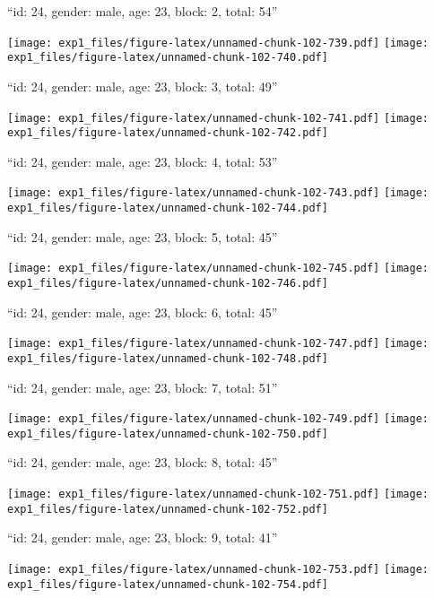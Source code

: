 \documentclass[11pt,,]{article}
\begin{document}
\newpage
[1] 

``id: 24, gender: male, age: 23, block: 2, total: 54''

\texttt{[image: exp1\_files/figure-latex/unnamed-chunk-102-739.pdf]}
\texttt{[image: exp1\_files/figure-latex/unnamed-chunk-102-740.pdf]}

\newpage
[1] 

``id: 24, gender: male, age: 23, block: 3, total: 49''

\texttt{[image: exp1\_files/figure-latex/unnamed-chunk-102-741.pdf]}
\texttt{[image: exp1\_files/figure-latex/unnamed-chunk-102-742.pdf]}

\newpage
[1] 

``id: 24, gender: male, age: 23, block: 4, total: 53''

\texttt{[image: exp1\_files/figure-latex/unnamed-chunk-102-743.pdf]}
\texttt{[image: exp1\_files/figure-latex/unnamed-chunk-102-744.pdf]}

\newpage
[1] 

``id: 24, gender: male, age: 23, block: 5, total: 45''

\texttt{[image: exp1\_files/figure-latex/unnamed-chunk-102-745.pdf]}
\texttt{[image: exp1\_files/figure-latex/unnamed-chunk-102-746.pdf]}

\newpage
[1] 

``id: 24, gender: male, age: 23, block: 6, total: 45''

\texttt{[image: exp1\_files/figure-latex/unnamed-chunk-102-747.pdf]}
\texttt{[image: exp1\_files/figure-latex/unnamed-chunk-102-748.pdf]}

\newpage
[1] 

``id: 24, gender: male, age: 23, block: 7, total: 51''

\texttt{[image: exp1\_files/figure-latex/unnamed-chunk-102-749.pdf]}
\texttt{[image: exp1\_files/figure-latex/unnamed-chunk-102-750.pdf]}

\newpage
[1] 

``id: 24, gender: male, age: 23, block: 8, total: 45''

\texttt{[image: exp1\_files/figure-latex/unnamed-chunk-102-751.pdf]}
\texttt{[image: exp1\_files/figure-latex/unnamed-chunk-102-752.pdf]}

\newpage
[1] 

``id: 24, gender: male, age: 23, block: 9, total: 41''

\texttt{[image: exp1\_files/figure-latex/unnamed-chunk-102-753.pdf]}
\texttt{[image: exp1\_files/figure-latex/unnamed-chunk-102-754.pdf]}
\end{document}
